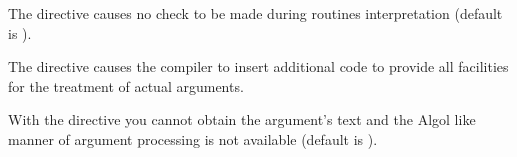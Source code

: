 
The directive  causes no check to be made during routines
interpretation (default is ).
 
 
The directive  causes the \COMIS{} compiler to insert additional
code to provide all facilities for the treatment of actual arguments.
 

With the directive  you cannot obtain the argument's text
and the Algol like manner of argument processing is not available
(default is ).

